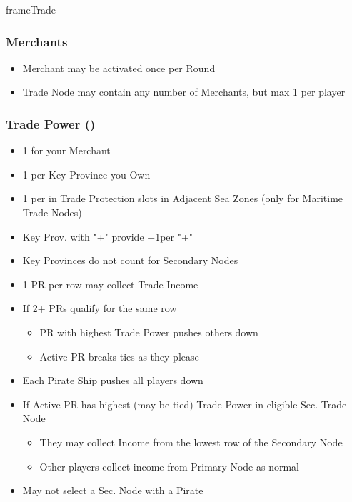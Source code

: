 \documentclass[10pt]{article}
\newlength{\fhTrade} \setlength\fhTrade{15\baselineskip}
\begin{document}
\begin{dynamiccontents*}{frameTrade}\begin{eubox}{\fhTrade}
	\begin{multicols}{2}
		\subsubsection*{Merchants }
		\begin{itemize}
			\item Merchant may be activated once per Round
			\item Trade Node may contain any number of Merchants, but max 1 per player
		\end{itemize}

		\subsubsection*{Trade Power (\tradepower) }
		\begin{itemize}
			\item 1 \tradepower for your Merchant
			\item 1 \tradepower per Key Province you Own
			\item 1 \tradepower per \ship in Trade Protection slots in Adjacent Sea Zones (only for Maritime Trade Nodes)
			\item Key Prov. with "+" provide +1\tradepower per "+"
			\item Key Provinces do not count for Secondary Nodes
		\end{itemize}
		\begin{itemize}
			\item 1 PR per row may collect Trade Income
			\item If 2+ PRs qualify for the same row
			\begin{itemize}
				\item PR with highest Trade Power pushes others down
				\item Active PR breaks ties as they please
			\end{itemize}
			\item Each Pirate Ship pushes all players down 
		\end{itemize}
		\begin{itemize}
			\item If Active PR has highest (may be tied) Trade Power in eligible Sec. Trade Node
			\begin{itemize}
				\item They may collect Income from the lowest row of the Secondary Node
				\item Other players collect income from Primary Node as normal
			\end{itemize}
			\item May not select a Sec. Node with a Pirate
		\end{itemize}
	\end{multicols}
\end{eubox}\end{dynamiccontents*}
\end{document}
